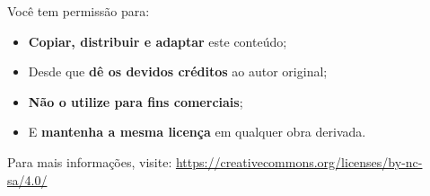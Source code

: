 \documentclass[12pt]{book}
\begin{document}
	\vspace{1em}
	
	Você tem permissão para:
	
	\begin{itemize}
		\item \textbf{Copiar, distribuir e adaptar} este conteúdo;
		\item Desde que \textbf{dê os devidos créditos} ao autor original;
		\item \textbf{Não o utilize para fins comerciais};
		\item E \textbf{mantenha a mesma licença} em qualquer obra derivada.
	\end{itemize}
	
	\vspace{1em}
	
	Para mais informações, visite:  
	\href{https://creativecommons.org/licenses/by-nc-sa/4.0/}{https://creativecommons.org/licenses/by-nc-sa/4.0/}
	
	\vfill
	
	\begin{center}
		\faCreativeCommons\quad
		\faCreativeCommonsBy\quad
		\faCreativeCommonsNc\quad
		\faCreativeCommonsSa
	\end{center}
	
\end{document}
